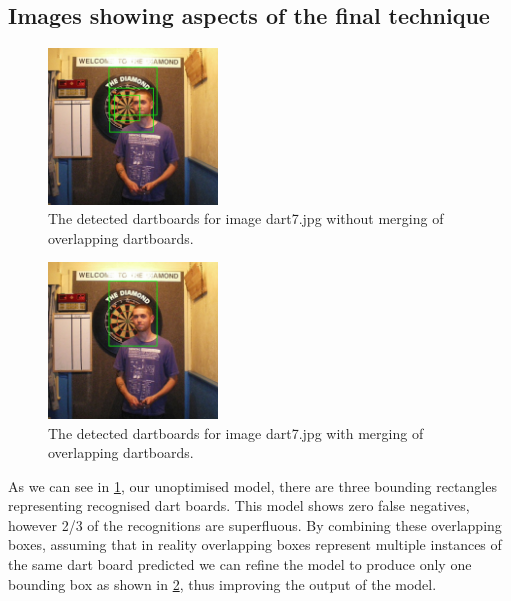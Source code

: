 \documentclass[conference]{IEEEtran}
\begin{document}
\subsection{Images showing aspects of the final technique}

\begin{figure}[ht!]
	\centering
	\includegraphics[width=45mm]{img/Task4_Images/detected_dart7_unmerged.jpg}
	\caption{The detected dartboards for image dart7.jpg without merging of overlapping dartboards.}
	\label{Unmerged VJ-Hough}
\end{figure}

\begin{figure}[ht!]
	\centering
	\includegraphics[width=45mm]{img/Task4_Images/detected_dart7_merged.jpg}
	\caption{The detected dartboards for image dart7.jpg with merging of overlapping dartboards.}
	\label{Merged VJ-Hough}
\end{figure}

As we can see in \cref{Unmerged VJ-Hough}, our unoptimised model, there are three bounding rectangles representing recognised dart boards. This model shows zero false negatives, however 2/3 of the recognitions are superfluous. By combining these overlapping boxes, assuming that in reality overlapping boxes represent multiple instances of the same dart board predicted we can refine the model to produce only one bounding box as shown in \cref{Merged VJ-Hough}, thus improving the output of the model.
\end{document}
